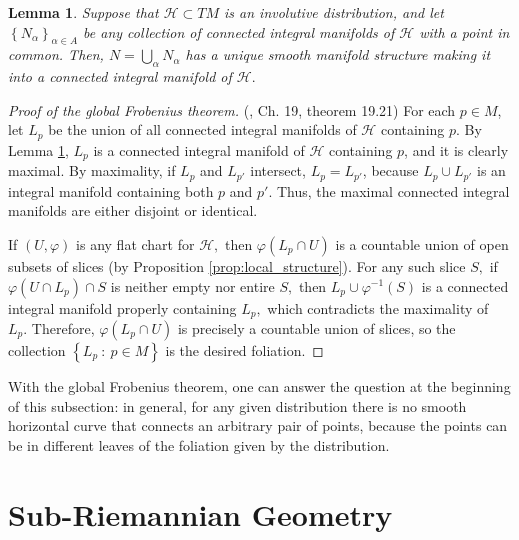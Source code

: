 \documentclass[12pt, letterpaper, reqno]{amsart}
\theoremstyle{definition}
\theoremstyle{plain}
\newtheorem{lm}{Lemma}
\theoremstyle{remark}
\begin{document}
\begin{lm}\label{lm:man_struct}
	Suppose that $ \mathcal{H}\subset TM $ is an involutive distribution, and let $ \left\{ N_\alpha \right\}_{\alpha\in A} $ be any collection of connected integral manifolds of $ \mathcal{H} $ with a point in common. Then, $ N=\bigcup_{\alpha} N_\alpha $ has a unique smooth manifold structure making it into a connected integral manifold of $ \mathcal{H}. $  
\end{lm}

\begin{proof}[Proof of the global Frobenius theorem]
	(\cite{lee2003introduction}, Ch. 19, theorem 19.21) For each $ p\in M $, let $ L_p $ be the union of all connected integral manifolds of $ \mathcal{H} $ containing $ p. $ By Lemma \ref{lm:man_struct}, $ L_p $ is a connected integral manifold of $ \mathcal{H} $ containing $ p $, and it is clearly maximal. By maximality, if $ L_p $ and $ L_{p'} $ intersect, $ L_p=L_{p'} $, because $ L_p\cup L_{p'} $ is an integral manifold containing both $ p $ and $ p' $. Thus, the maximal connected integral manifolds are either disjoint or identical.    

	If $ (U,\varphi) $ is any flat chart for $ \mathcal{H}, $ then $ \varphi(L_p\cap U) $ is a countable union of open subsets of slices (by Proposition \ref{prop:local_structure}). For any such slice $ S, $ if $ \varphi(U\cap L_p)\cap S $ is neither empty nor entire $ S, $ then $ L_p\cup \varphi^{-1}(S )$ is a connected integral manifold properly containing $ L_p, $ which contradicts the maximality of $ L_p. $ Therefore, $ \varphi(L_p\cap U) $ is precisely a countable union of slices, so the collection $ \left\{ L_p\ : \ p\in M \right\} $ is the desired foliation.
\end{proof}

With the global Frobenius theorem, one can answer the question at the beginning of this subsection: in general, for any given distribution there is no smooth horizontal curve that connects an arbitrary pair of points, because the points can be in different leaves of the foliation given by the distribution.


\section{Sub-Riemannian Geometry}%
\label{sec:sub-Riemannian_geometry}
\end{document}
